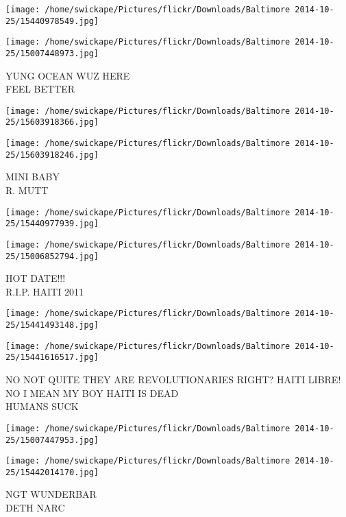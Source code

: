 \documentclass[10pt,letterpaper]{article}
\begin{document}
\texttt{[image: /home/swickape/Pictures/flickr/Downloads/Baltimore 2014-10-25/15440978549.jpg]}

\vspace{0.25in}
\texttt{[image: /home/swickape/Pictures/flickr/Downloads/Baltimore 2014-10-25/15007448973.jpg]}

YUNG OCEAN WUZ HERE\\
FEEL BETTER\\
\pagebreak

\texttt{[image: /home/swickape/Pictures/flickr/Downloads/Baltimore 2014-10-25/15603918366.jpg]}

\vspace{0.25in}
\texttt{[image: /home/swickape/Pictures/flickr/Downloads/Baltimore 2014-10-25/15603918246.jpg]}

MINI BABY\\
R. MUTT\\
\pagebreak

\texttt{[image: /home/swickape/Pictures/flickr/Downloads/Baltimore 2014-10-25/15440977939.jpg]}

\vspace{0.25in}
\texttt{[image: /home/swickape/Pictures/flickr/Downloads/Baltimore 2014-10-25/15006852794.jpg]}

HOT DATE!!!\\
R.I.P. HAITI 2011\\
\pagebreak

\texttt{[image: /home/swickape/Pictures/flickr/Downloads/Baltimore 2014-10-25/15441493148.jpg]}

\vspace{0.25in}
\texttt{[image: /home/swickape/Pictures/flickr/Downloads/Baltimore 2014-10-25/15441616517.jpg]}

NO NOT QUITE THEY ARE REVOLUTIONARIES RIGHT?  HAITI LIBRE!  NO I MEAN MY BOY HAITI IS DEAD\\
HUMANS SUCK\\
\pagebreak

\texttt{[image: /home/swickape/Pictures/flickr/Downloads/Baltimore 2014-10-25/15007447953.jpg]}

\vspace{0.25in}
\texttt{[image: /home/swickape/Pictures/flickr/Downloads/Baltimore 2014-10-25/15442014170.jpg]}

NGT WUNDERBAR\\
DETH NARC\\
\pagebreak
\end{document}
